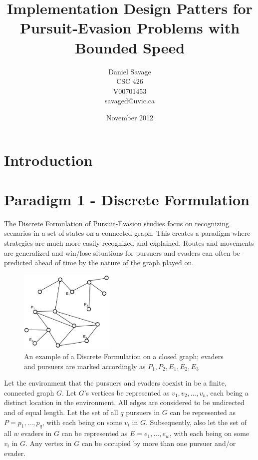 \documentclass{article}
\begin{document}
\title{Implementation Design Patters for Pursuit-Evasion Problems with Bounded Speed}
\author{Daniel Savage\\CSC 426\\{V00701453}\\savaged@uvic.ca}
\date{November 2012}
\maketitle
\pagebreak

\section{Introduction}

\section{Paradigm 1 - Discrete Formulation}
The Discrete Formulation of Pursuit-Evasion studies focus on recognizing scenarios in a set of states on a connected graph. This creates a paradigm where strategies are much more easily recognized and explained. Routes and movements are generalized and win/lose situations for pursuers and evaders can often be predicted ahead of time by the nature of the graph played on.

\begin{figure}[htb]
\centering
\includegraphics[width=0.4\textwidth]{"graph1"}
\caption{An example of a Discrete Formulation on a closed graph; evaders and pursuers are marked accordingly as \(P_1,P_2,E_1,E_2,E_3\)}
\label{fig:awesome_image}
\end{figure}

Let the environment that the pursuers and evaders coexist in be a finite, connected graph \(G\). Let \(G\)'s vertices be represented as \(v_1,v_2,...,v_n\), each being a distinct location in the environment. All edges are considered to be undirected and of equal length. Let the set of all \(q\) pursuers in \(G\) can be represented as \(P = {p_1,...,p_q}\), with each being on some \(v_i\) in \(G\). Subsequently, also let the set of all \(w\) evaders in \(G\) can be represented as \(E = {e_1,...,e_w}\), with each being on some \(v_i\) in \(G\). Any vertex in \(G\) can be occupied by more than one pursuer and/or evader.
\end{document}
